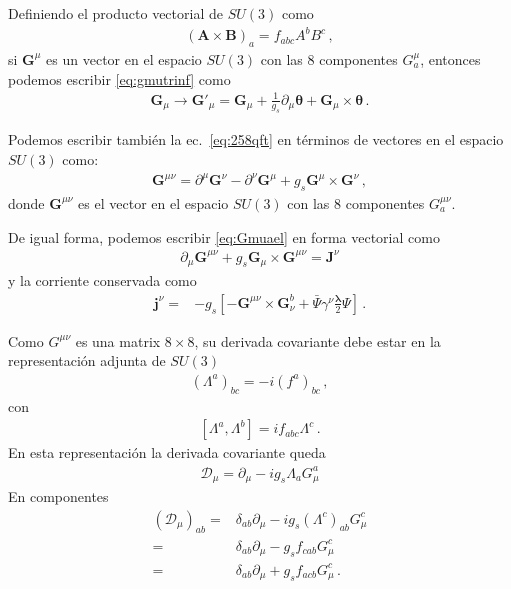 Definiendo el producto vectorial de $SU(3)$ como
\begin{align}
  \left(\mathbf{A}\times \mathbf{B}\right)_a=f_{abc}A^b B^c\,,
\end{align}
si $\mathbf{G}^\mu$ es un vector en el espacio $SU(3)$ con las 8 componentes $G^\mu_a$, entonces podemos escribir \eqref{eq:gmutrinf} como
\begin{align}
  \mathbf{G}_\mu\to\mathbf{G}'_\mu=\mathbf{G}_\mu+\frac{1}{g_s}\partial_\mu\boldsymbol{\theta}+\mathbf{G}_\mu\times \boldsymbol{\theta}\,.
\end{align}

Podemos escribir también la ec.~\eqref{eq:258qft} en términos de vectores en el espacio $SU(3)$ como:
\begin{align}
  \mathbf{G}^{\mu\nu}=\partial^\mu \mathbf{G}^\nu-\partial^\nu \mathbf{G}^\mu+g_s \mathbf{G}^\mu\times  \mathbf{G}^\nu\,,
\end{align}
donde $\mathbf{G}^{\mu\nu}$ es el vector en el espacio $SU(3)$ con las 8 componentes $G^{\mu\nu}_a$.



De igual forma, podemos escribir \eqref{eq:Gmuael} en forma vectorial como
\begin{align}
  \partial_\mu\mathbf{G}^{\mu\nu}+g_s \mathbf{G}_\mu\times \mathbf{G}^{\mu\nu}=\mathbf{J}^\nu
\end{align}
y la corriente conservada como
\begin{align}
 \mathbf{j}^\nu =&-g_s\left[-\mathbf{G}^{\mu\nu}\times \mathbf{G}_\nu^b+\bar{\Psi}\gamma^\nu\frac{\boldsymbol{\lambda}}{2}\Psi  \right]\,.
\end{align}

Como ${G}^{\mu\nu}$ es una matrix $8\times 8$, su derivada covariante debe estar en la representación adjunta de $SU(3)$
\begin{align}
  \left(\Lambda^a\right)_{bc}=-i\left(f^a\right)_{bc}\,,
\end{align}
con
\begin{align}
  \left[\Lambda^a,\Lambda^b\right]=i f_{abc}\Lambda^c\,.
\end{align}
En esta representación la derivada covariante queda
\begin{align}
  \mathcal{D}_\mu=\partial_\mu-i g_s\Lambda_aG_\mu^a
\end{align}
En componentes
\begin{align}
  \left(\mathcal{D}_\mu\right)_{ab}=&\delta_{ab}\partial_\mu-i g_s (\Lambda^c)_{ab}G_\mu^c\nonumber\\
  =&\delta_{ab}\partial_\mu-g_s f_{cab}G_\mu^c\nonumber\\
  =&\delta_{ab}\partial_\mu+g_s f_{acb}G_\mu^c\,.
\end{align}

